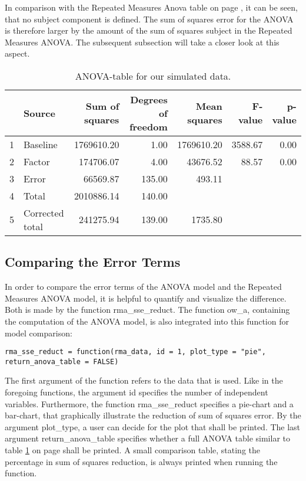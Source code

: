 \documentclass[11pt]{article}
\begin{document}
					In comparison with the Repeated Measures Anova table on page \pageref{table:outputtable1}, it can be seen, that no subject component is defined. The sum of squares error for the ANOVA is therefore larger by the amount of the sum of squares subject in the Repeated Measures ANOVA. The subsequent subsection will take a closer look at this aspect.
									
						
\begin{table}[ht]
\centering
\begin{tabular}{rlrrrrr}
  \hline
 & Source & Sum of squares & Degrees of freedom & Mean squares & F-value & p-value \\ 
  \hline
1 & Baseline & 1769610.20 & 1.00 & 1769610.20 & 3588.67 & 0.00 \\ 
  2 & Factor & 174706.07 & 4.00 & 43676.52 & 88.57 & 0.00 \\ 
  3 & Error & 66569.87 & 135.00 & 493.11 &  &  \\ 
  4 & Total & 2010886.14 & 140.00 &  &  &  \\ 
  5 & Corrected total & 241275.94 & 139.00 & 1735.80 &  &  \\ 
   \hline
\end{tabular}
\caption{ANOVA-table for our simulated data.}\label{table:outputtable2}
\end{table}
              
			
			
			
		\subsection{Comparing the Error Terms}
					In order to compare the error terms of the ANOVA model and the Repeated Measures ANOVA model, it is helpful to quantify and visualize the difference. Both is made by the function rma_sse_reduct. The function ow_a, containing the computation of the ANOVA model, is also integrated into this function for model comparison:\\
		
\begin{lstlisting}
rma_sse_reduct = function(rma_data, id = 1, plot_type = "pie", return_anova_table = FALSE)
\end{lstlisting}

					The first argument of the function refers to the data that is used. Like in the foregoing functions, the argument id specifies the number of independent variables. Furthermore, the function rma_sse_reduct specifies a pie-chart and a bar-chart, that graphically illustrate the reduction of sum of squares error. By the argument plot_type, a user can decide for the plot that shall be printed. The last argument return_anova_table specifies whether a full ANOVA table similar to table \ref{table:outputtable2} on page \pageref{table:outputtable2} shall be printed. A small comparison table, stating the percentage in sum of squares reduction, is always printed when running the function.\\
					
\end{document}
